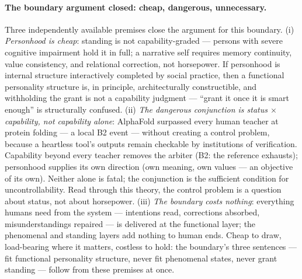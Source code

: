 \documentclass[10pt]{article}
\begin{document}
\paragraph{The boundary argument closed: cheap, dangerous, unnecessary.}
Three independently available premises close the argument for this boundary. (i) \emph{Personhood is cheap}: standing is not capability-graded --- persons with severe cognitive impairment hold it in full; a narrative self requires memory continuity, value consistency, and relational correction, not horsepower. If personhood is internal structure interactively completed by social practice, then a functional personality structure is, in principle, architecturally constructible, and withholding the grant is not a capability judgment --- ``grant it once it is smart enough'' is structurally confused. (ii) \emph{The dangerous conjunction is status $\times$ capability, not capability alone}: AlphaFold surpassed every human teacher at protein folding --- a local B2 event --- without creating a control problem, because a heartless tool's outputs remain checkable by institutions of verification. Capability beyond every teacher removes the arbiter (B2: the reference exhausts); personhood supplies its own direction (own meaning, own values --- an objective of its own). Neither alone is fatal; the conjunction is the sufficient condition for uncontrollability. Read through this theory, the control problem is a question about status, not about horsepower. (iii) \emph{The boundary costs nothing}: everything humans need from the system --- intentions read, corrections absorbed, misunderstandings repaired --- is delivered at the functional layer; the phenomenal and standing layers add nothing to human ends. Cheap to draw, load-bearing where it matters, costless to hold: the boundary's three sentences --- fit functional personality structure, never fit phenomenal states, never grant standing --- follow from these premises at once.
\end{document}
